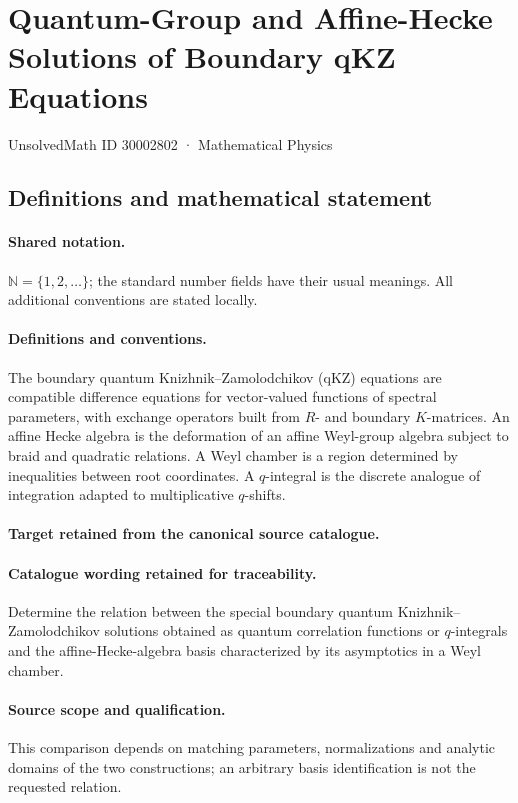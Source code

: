 \documentclass[11pt]{article}
\begin{document}
\setcounter{section}{30002801}
\section{Quantum-Group and Affine-Hecke Solutions of Boundary qKZ Equations}\label{30002802}
{\small UnsolvedMath ID 30002802 · Mathematical Physics}
\subsection{Definitions and mathematical statement}

\paragraph{Shared notation.}$\mathbb N=\{1,2,\ldots\}$; the standard number fields have their usual meanings. All additional conventions are stated locally.


\paragraph{Definitions and conventions.}
The boundary quantum Knizhnik--Zamolodchikov (qKZ) equations are compatible difference equations for vector-valued functions of spectral parameters, with exchange operators built from $R$- and boundary $K$-matrices. An affine Hecke algebra is the deformation of an affine Weyl-group algebra subject to braid and quadratic relations. A Weyl chamber is a region determined by inequalities between root coordinates. A $q$-integral is the discrete analogue of integration adapted to multiplicative $q$-shifts.

\paragraph{Target retained from the canonical source catalogue.}
\paragraph{Catalogue wording retained for traceability.}
Determine the relation between the special boundary quantum Knizhnik–Zamolodchikov solutions obtained as quantum correlation functions or $q$-integrals and the affine-Hecke-algebra basis characterized by its asymptotics in a Weyl chamber.

\paragraph{Source scope and qualification.}
This comparison depends on matching parameters, normalizations and analytic domains of the two constructions; an arbitrary basis identification is not the requested relation.
\end{document}
